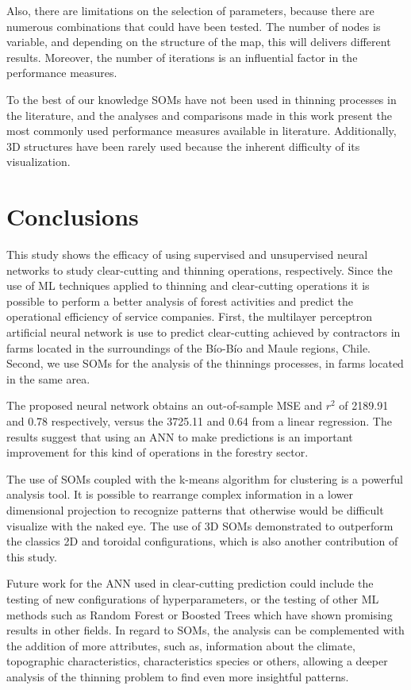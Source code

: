 \documentclass[conference]{IEEEtran}
\begin{document}
Also, there are limitations on the selection of parameters, because there are numerous combinations that could have been tested. The number of nodes is variable, and depending on the structure of the map, this will delivers different results. Moreover, the number of iterations is an influential factor in the performance measures.

To the best of our knowledge SOMs have not been used in thinning processes in the literature, and the analyses and comparisons made in this work present the most commonly used performance measures available in literature. Additionally, 3D structures have been rarely used because the inherent difficulty of its visualization.

\section{Conclusions}

This study shows the efficacy of using supervised and unsupervised neural networks to study clear-cutting and thinning operations, respectively. Since the use of ML techniques applied to thinning and clear-cutting operations it is possible to perform a better analysis of forest activities and predict the operational efficiency of service companies. First, the multilayer perceptron artificial neural network is use to predict clear-cutting achieved by contractors in farms located in the surroundings of the Bío-Bío and Maule regions, Chile. Second, we use SOMs for the analysis of the thinnings processes, in farms located in the same area.

The proposed neural network obtains an out-of-sample MSE and $r^{2}$ of 2189.91 and 0.78 respectively, versus the 3725.11 and 0.64 from a linear regression. The results suggest that using an ANN to make predictions is an important improvement for this kind of operations in the forestry sector.

The use of SOMs coupled with the k-means algorithm for clustering is a powerful analysis tool. It is possible to rearrange complex information in a lower dimensional projection to recognize patterns that otherwise would be difficult visualize with the naked eye. The use of 3D SOMs demonstrated to outperform the classics 2D and toroidal configurations, which is also another contribution of this study.

Future work for the ANN used in clear-cutting prediction could include the testing of new configurations of hyperparameters, or the testing of other ML methods such as Random Forest or Boosted Trees which have shown promising results in other fields. In regard to SOMs, the analysis can be complemented with the addition of more attributes, such as, information about the climate, topographic characteristics, characteristics species or others, allowing a deeper analysis of the thinning problem to find even more insightful patterns. 
\end{document}
